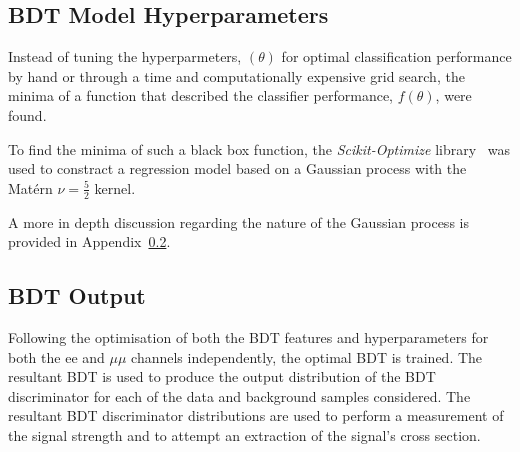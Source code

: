 \subsection{BDT Model Hyperparameters}
Instead of tuning the hyperparmeters, $(\theta)$ for optimal classification performance by hand or through a time and computationally expensive grid search, the minima of a function that described the classifier performance, $f(\theta)$, were found.

To find the minima of such a black box function, the \emph{Scikit-Optimize} library~\cite{scikit-optimise} was used to constract a regression model based on a Gaussian process with the Mat\'{e}rn $\nu =\frac{5}{2}$ kernel.



A more in depth discussion regarding the nature of the Gaussian process is provided in Appendix~\ref{}.

\subsection{BDT Output}
Following the optimisation of both the BDT features and hyperparameters for both the ee and $\mu\mu$ channels independently, the optimal BDT is trained.
The resultant BDT is used to produce the output distribution of the BDT discriminator for each of the data and background samples considered.
The resultant BDT discriminator distributions are used to perform a measurement of the signal strength and to attempt an extraction of the signal's cross section.
